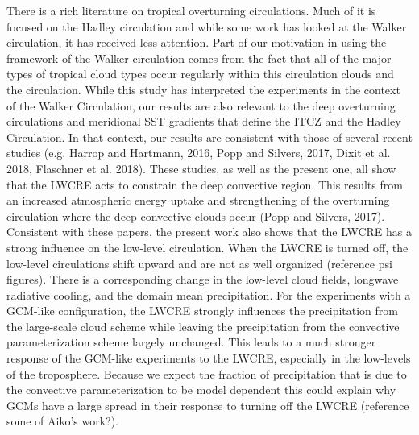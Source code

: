 \documentclass[11pt]{article}   	%
\begin{document}
There is a rich literature on tropical overturning circulations.  Much of it is focused on the Hadley circulation and while some
work has looked at the Walker circulation, it has received less attention.  Part of our motivation in using the framework of the 
Walker circulation comes from the fact that all of the major types of tropical cloud types occur regularly within this circulation
clouds and the circulation.  While this study has interpreted the experiments in the context of the Walker Circulation, our results 
are also relevant to the deep overturning circulations and meridional SST gradients that define the ITCZ and the Hadley 
Circulation.  In that context, our results are consistent with those of several recent studies (e.g. Harrop and Hartmann, 2016, 
Popp and Silvers, 2017, Dixit et al. 2018, Flaschner et al. 2018).  These studies, as well as the present one, all show that the 
LWCRE acts to constrain the deep convective region.  This results from an increased atmospheric energy uptake and 
strengthening of the overturning circulation where the deep convective clouds occur (Popp and Silvers, 2017).  Consistent with 
these papers, the present work also shows that the LWCRE has a strong influence on the low-level circulation.   When 
the LWCRE is turned off, the low-level circulations shift upward and are not as well organized (reference psi figures).
There is a corresponding change in the low-level cloud fields, longwave radiative cooling, and the domain mean precipitation.
For the experiments with a GCM-like configuration, the LWCRE strongly influences the precipitation from the large-scale
cloud scheme while leaving the precipitation from the convective parameterization scheme largely unchanged.  This leads 
to a much stronger response of the GCM-like experiments to the LWCRE, especially in the low-levels of the troposphere.  
Because we expect the fraction of precipitation that is due to the convective parameterization to be model dependent 
this could explain why GCMs have a large spread in their response to turning off the LWCRE (reference some 
of Aiko's work?). 
\end{document}
